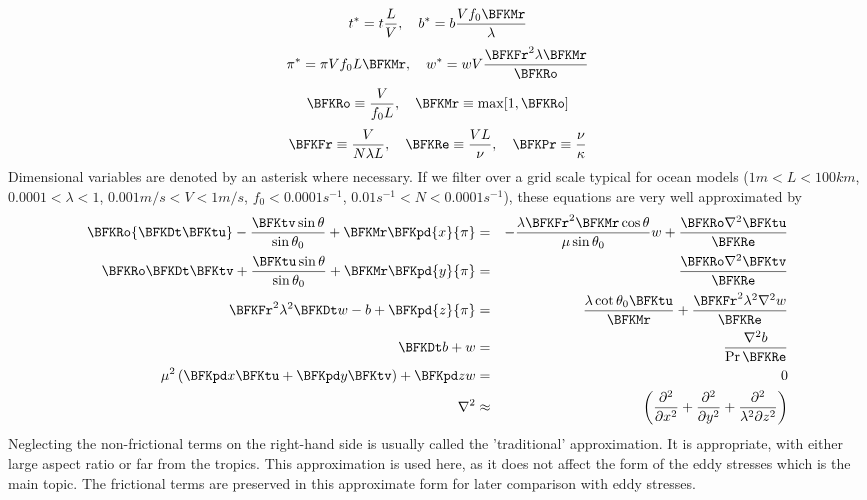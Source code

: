 \begin{equation}
t^*=t \frac{L}{V},\ \ \  b^*= b\frac{V f_0\BFKMr}{\lambda}
\end{equation}
\begin{equation}
\pi^*=\pi V f_0 L\BFKMr,\ \ \  
w^*=w V \frac{\BFKFr^2\lambda\BFKMr}{\BFKRo}
\end{equation}
\begin{equation}
\BFKRo\equiv\frac{V}{f_0 L},\ \ \  \BFKMr\equiv \max[1,\BFKRo]
\end{equation}
\begin{equation}
\BFKFr\equiv\frac{V}{N \lambda L}, \ \ \   
\BFKRe\equiv\frac{VL}{\nu}, \ \ \   
\BFKPr\equiv\frac{\nu}{\kappa}
\end{equation}
Dimensional variables are denoted by an asterisk where necessary.  If
we filter over a grid scale typical for ocean models ($1m<L<100km$,
$0.0001<\lambda<1$, $0.001m/s <V<1 m/s$, $f_0<0.0001 s^{-1}$, $0.01
s^{-1}<N<0.0001 s^{-1}$), these equations are very well approximated
by
\begin{eqnarray}
\BFKRo{\BFKDt\BFKtu}- \frac{\BFKtv
  \sin\theta}{\sin\theta_0}+\BFKMr\BFKpd{x}{\pi}
& =& -\frac{\lambda\BFKFr^2\BFKMr\cos \theta}{\mu\sin\theta_0} w
+\frac{\BFKRo\nabla^2{\BFKtu}}{\BFKRe} \\
\BFKRo\BFKDt\BFKtv+
\frac{\BFKtu\sin\theta}{\sin\theta_0}+\BFKMr\BFKpd{y}{\pi}
& = & \frac{\BFKRo\nabla^2{\BFKtv}}{\BFKRe} \\
\BFKFr^2\lambda^2\BFKDt w -b+\BFKpd{z}{\pi}
& = & \frac{\lambda\cot \theta_0 \BFKtu}{\BFKMr}
+\frac{\BFKFr^2\lambda^2\nabla^2w}{\BFKRe} \\
\BFKDt b+w & = & \frac{\nabla^2 b}{\Pr\BFKRe} \\
\mu^2\left(\BFKpd x\BFKtu + \BFKpd y\BFKtv \right)+\BFKpd z w
& = & 0 \\
\nabla^2 & \approx & \left(\frac{\partial^2}{\partial x^2}
  +\frac{\partial^2}{\partial y^2}
  +\frac{\partial^2}{\lambda^2\partial z^2}\right)
\end{eqnarray}
Neglecting the non-frictional terms on the right-hand side is usually
called the 'traditional' approximation.  It is appropriate, with
either large aspect ratio or far from the tropics.  This approximation
is used here, as it does not affect the form of the eddy stresses
which is the main topic.  The frictional terms are preserved in this
approximate form for later comparison with eddy stresses.
